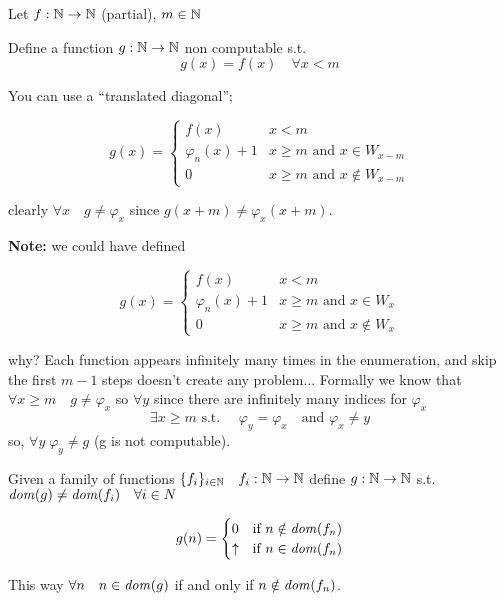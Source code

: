 \begin{exercise}
  Let $f: \mathbb{N} \rightarrow \mathbb{N}$ (partial), $m \in \mathbb{N}$

  Define a function $g : \mathbb{N} \rightarrow \mathbb{N}$ non computable
  s.t. \[g(x) = f(x) \quad \forall x < m\]

  You can use a ``translated diagonal'';


  \[
    g(x) = \begin{cases}
      f(x) & x < m \\
      \varphi_n(x) + 1 & x \geq m \mbox{ and } x \in W_{x-m} \\
      0 & x \geq m \mbox{ and } x \notin W_{x-m}
    \end{cases}
  \]

  clearly $\forall x \quad g\neq \varphi_x$ since
  $g(x + m) \neq \varphi_x(x+m)$.

  \textbf{Note:} we could have defined

  \[
    g(x) = \begin{cases}
      f(x) & x < m \\
      \varphi_n(x) + 1 & x \geq m \mbox{ and } x \in W_{x} \\
      0 & x \geq m \mbox{ and } x \notin W_{x}
    \end{cases}
  \]

  why? Each function appears infinitely many times in the enumeration,
  and skip the first $m-1$ steps doesn't create any
  problem... Formally we know that
  $\forall x \geq m \quad g \neq \varphi_x$ so $\forall y$ since there
  are infinitely many indices for $\varphi_x$
  \[\exists x \geq m \mbox{ s.t. } \quad \varphi_y = \varphi_x \quad
    \mbox{and } \varphi_x \neq y\] so, $\forall y \; \varphi_y \neq g$
  (g is not computable).
\end{exercise}

\begin{exercise}
  Given a family of functions
  $\{f_i\}_{i\in \mathbb{N}} \quad f_i : \mathbb{N} \rightarrow \mathbb{N}$ define $g: \mathbb{N} \rightarrow \mathbb{N}$
  s.t. $\mathit{dom}({g}) \neq \mathit{dom}({f_i}) \quad \forall i \in N$

  \[
    g(n) = \begin{cases}
      0 & \mbox{if } n \notin \mathit{dom}({f_n}) \\
      \uparrow & \mbox{if } n \in \mathit{dom}({f_n})
    \end{cases}
  \]

  This way $\forall n \quad n \in \mathit{dom}({g})$ if and only if
  $n \notin \mathit{dom}({f_n})$.
\end{exercise}

